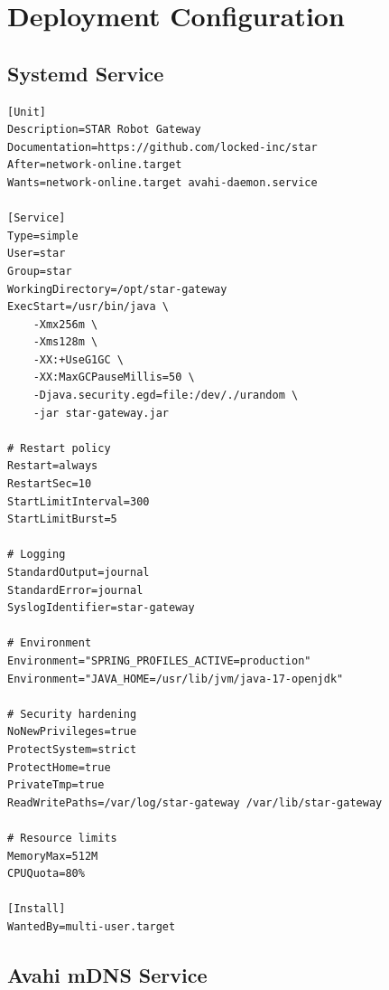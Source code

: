 \section{Deployment Configuration}

\subsection{Systemd Service}

\begin{lstlisting}[caption=star-gateway/deployment/star-gateway.service]
[Unit]
Description=STAR Robot Gateway
Documentation=https://github.com/locked-inc/star
After=network-online.target
Wants=network-online.target avahi-daemon.service

[Service]
Type=simple
User=star
Group=star
WorkingDirectory=/opt/star-gateway
ExecStart=/usr/bin/java \
    -Xmx256m \
    -Xms128m \
    -XX:+UseG1GC \
    -XX:MaxGCPauseMillis=50 \
    -Djava.security.egd=file:/dev/./urandom \
    -jar star-gateway.jar

# Restart policy
Restart=always
RestartSec=10
StartLimitInterval=300
StartLimitBurst=5

# Logging
StandardOutput=journal
StandardError=journal
SyslogIdentifier=star-gateway

# Environment
Environment="SPRING_PROFILES_ACTIVE=production"
Environment="JAVA_HOME=/usr/lib/jvm/java-17-openjdk"

# Security hardening
NoNewPrivileges=true
ProtectSystem=strict
ProtectHome=true
PrivateTmp=true
ReadWritePaths=/var/log/star-gateway /var/lib/star-gateway

# Resource limits
MemoryMax=512M
CPUQuota=80%

[Install]
WantedBy=multi-user.target
\end{lstlisting}

\subsection{Avahi mDNS Service}

